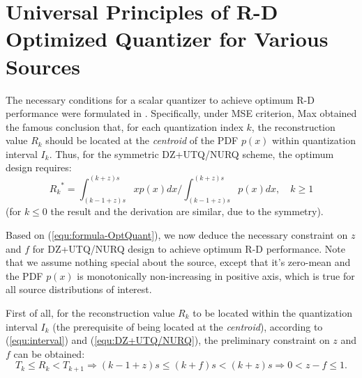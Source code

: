 \documentclass[smallabstract,smallcaptions]{dccpaper}
\begin{document}
\section{Universal Principles of R-D Optimized Quantizer for Various Sources}
\label{sec:principle}

The necessary conditions for a scalar quantizer to achieve optimum R-D performance were formulated in \cite{Farvardin_TIT1984}. Specifically, under MSE criterion, Max \cite{Max_TIT1960} obtained the famous conclusion that, for each quantization index $k$, the reconstruction value $R_k$ should be located at the \emph{centroid} of the PDF $p(x)$ within quantization interval $I_k$. Thus, for the symmetric DZ+UTQ/NURQ scheme, the optimum design requires:
\begin{equation}\label{equ:formula-OptQuant}
	{R_k}^* = \int_{(k-1+z)s}^{(k+z)s} xp(x)dx / \int_{(k-1+z)s}^{(k+z)s} p(x)dx, \quad k \ge 1
\end{equation}
(for $k \le 0$ the result and the derivation are similar, due to the symmetry).

Based on (\ref{equ:formula-OptQuant}), we now deduce the necessary constraint on $z$ and $f$ for DZ+UTQ/NURQ design to achieve optimum R-D performance.
Note that we assume nothing special about the source, except that it's zero-mean and the PDF $p(x)$ is monotonically non-increasing in positive axis, which is true for all source distributions of interest.

First of all, for the reconstruction value $R_k$ to be located within the quantization interval $I_k$ (the prerequisite of being located at the \emph{centroid}), according to (\ref{equ:interval}) and (\ref{equ:DZ+UTQ/NURQ}), the preliminary constraint on $z$ and $f$ can be obtained:
\begin{equation}\label{equ:formula-PreConstraint}
	 T_k \le R_k < T_{k+1} \Rightarrow (k-1+z)s \le (k+f)s < (k+z)s \Rightarrow 0 < z - f \le1.
\end{equation}
\end{document}

